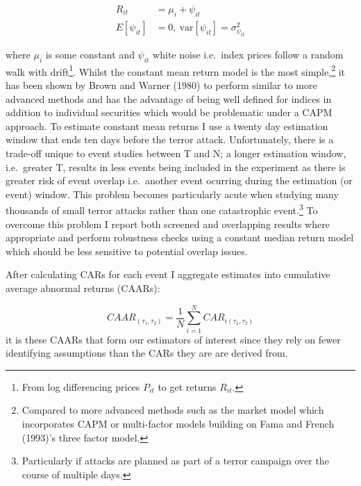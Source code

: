 \documentclass[]{AEA}
\begin{document}
\[\begin{aligned} R_{it} &= \mu_i + \psi_{it} \\ E[\psi_{it}] &= 0, \ \text{var}[\psi_{it}] = \sigma_{\psi_{it}}^2 \end{aligned}\]

where \(\mu_i\) is some constant and \(\psi_{it}\) white noise
i.e.~index prices follow a random walk with drift\footnote{From log
  differencing prices \(P_{it}\) to get returns \(R_{it}\).}. Whilst the
constant mean return model is the most simple,\footnote{Compared to more
  advanced methods such as the market model which incorporates CAPM or
  multi-factor models building on Fama and French (1993)'s three factor
  model.} it has been shown by Brown and Warner (1980) to perform
similar to more advanced methods and has the advantage of being well
defined for indices in addition to individual securities which would be
problematic under a CAPM approach. To estimate constant mean returns I
use a twenty day estimation window that ends ten days before the terror
attack. Unfortunately, there is a trade-off unique to event studies
between T and N; a longer estimation window, i.e.~greater T, results in
less events being included in the experiment as there is greater risk of
event overlap i.e.~another event ocurring during the estimation (or
event) window. This problem becomes particularly acute when studying
many thousands of small terror attacks rather than one catastrophic
event.\footnote{Particularly if attacks are planned as part of a terror
  campaign over the course of multiple days.} To overcome this problem I
report both screened and overlapping results where appropriate and
perform robustness checks using a constant median return model which
should be less sensitive to potential overlap issues.

After calculating CARs for each event I aggregate estimates into
cumulative average abnormal returns (CAARs):

\[CAAR_{(\tau_{1},\tau_{2})}=\frac{1}N \sum_{i=1}^{N} CAR_{i(\tau_{1},\tau_{2})}\]
it is these CAARs that form our estimators of interest since they rely
on fewer identifying assumptions than the CARs they are are derived
from.
\end{document}
